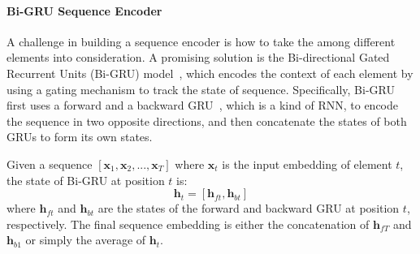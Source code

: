 \paragraph{Bi-GRU Sequence Encoder} 
A challenge in building a sequence encoder is how to take the  among different elements into consideration. A promising solution is the Bi-directional Gated Recurrent Units (Bi-GRU) model~\cite{bahdanau2015neural}, which encodes the context of each element by using a gating mechanism to track the state of sequence.
Specifically, Bi-GRU first uses a forward and a backward GRU~\cite{cho2014learning}, which is a kind of RNN, to encode the sequence in two opposite directions, and then concatenate the states of both GRUs to form its own states. 

Given a sequence $[\mathbf{x}_1, \mathbf{x}_2, ..., \mathbf{x}_T]$ where $\mathbf{x}_t$ is the input embedding of element $t$, the state of Bi-GRU at position $t$ is:
%
\begin{equation}
\mathbf{h}_t = [\mathbf{h}_{ft}, \mathbf{h}_{bt}]
\end{equation}
where $\mathbf{h}_{ft}$ and $\mathbf{h}_{bt}$ are the states of the forward and backward GRU at position $t$, respectively. 
The final sequence embedding is either the concatenation of $\mathbf{h}_{fT}$ and $\mathbf{h}_{b1}$
or simply the average of $\mathbf{h}_t$.





